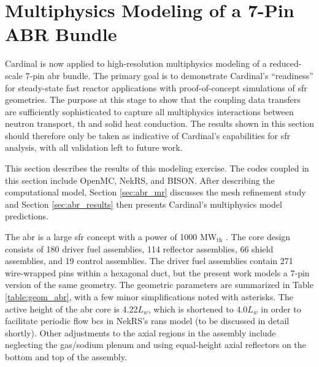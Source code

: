 \documentclass[3p,,preprint,11pt]{elsarticle}
\begin{document}
\section{Multiphysics Modeling of a 7-Pin ABR Bundle}
\label{sec:coupled}

Cardinal is now applied to high-resolution multiphysics modeling of a reduced-scale 7-pin \gls{abr} bundle. 
The primary goal is to demonstrate Cardinal's ``readiness'' for steady-state fast reactor applications with proof-of-concept simulations of \gls{sfr} geometries. The purpose at this stage to show that the coupling data transfers are sufficiently sophisticated to capture all multiphysics interactions between neutron transport, \gls{th} and solid heat conduction. The results shown in this section should therefore only be taken as indicative of Cardinal's capabilities for \gls{sfr} analysis, with all validation left to future work. 

This section describes the results of this modeling exercise. The codes coupled in this section include OpenMC, NekRS, and BISON. After describing the computational model, Section \ref{sec:abr_mr} discusses the mesh refinement study and Section \ref{sec:abr_results} then presents Cardinal's multiphysics model predictions.

The \gls{abr} is a large \gls{sfr} concept with a power of 1000 \si{\mega\watt}$_\text{th}$ \cite{abr}. The core design consists of 180 driver fuel assemblies, 114 reflector assemblies, 66 shield assemblies, and 19 control assemblies. The driver fuel assemblies contain 271 wire-wrapped pins within a hexagonal duct, but the present work models a 7-pin version of the same geometry. The geometric parameters are summarized in Table \ref{table:geom_abr}, with a few minor simplifications noted with asterisks. The active height of the \gls{abr} core is 4.22$L_w$, which is shortened to $4.0L_w$ in order to facilitate periodic flow \glspl{bc} in NekRS's \gls{rans} model (to be discussed in detail shortly). Other adjustments to the axial regions in the assembly include neglecting the gas/sodium plenum and using equal-height axial reflectors on the bottom and top of the assembly. %
\end{document}

